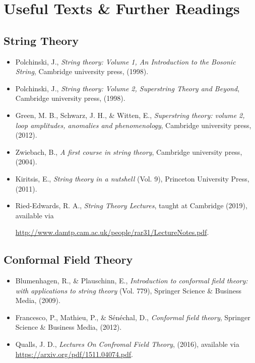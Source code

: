 \chapter*{Useful Texts \& Further Readings}

\section*{String Theory}
\begin{itemize}
    \item Polchinski, J., \textit{String theory: Volume 1, An Introduction to the Bosonic String}, Cambridge university press, (1998).
    \item Polchinski, J., \textit{String theory: Volume 2, Superstring Theory and Beyond}, Cambridge university press, (1998).
    \item Green, M. B., Schwarz, J. H., \& Witten, E., \textit{Superstring theory: volume 2, loop amplitudes, anomalies and phenomenology}, Cambridge university press, (2012).
    \item Zwiebach, B., \textit{A first course in string theory}, Cambridge university press, (2004).
    \item Kiritsis, E., \textit{String theory in a nutshell} (Vol. 9), Princeton University Press, (2011).
    \item Ried-Edwards, R. A., \textit{String Theory Lectures}, taught at Cambridge (2019), available via 
    
    \href{http://www.damtp.cam.ac.uk/people/rar31/LectureNotes.pdf}{http://www.damtp.cam.ac.uk/people/rar31/LectureNotes.pdf}.
\end{itemize}

\section*{Conformal Field Theory}
\begin{itemize}
    \item Blumenhagen, R., \& Plauschinn, E., \textit{Introduction to conformal field theory: with applications to string theory} (Vol. 779), Springer Science \& Business Media, (2009).
    \item Francesco, P., Mathieu, P., \& Sénéchal, D., \textit{Conformal field theory}, Springer Science \& Business Media, (2012).
    \item Qualls, J. D., \textit{Lectures On Confromal Field Theory}, (2016), available via \\
    \href{https://arxiv.org/pdf/1511.04074.pdf}{https://arxiv.org/pdf/1511.04074.pdf}.
\end{itemize}


